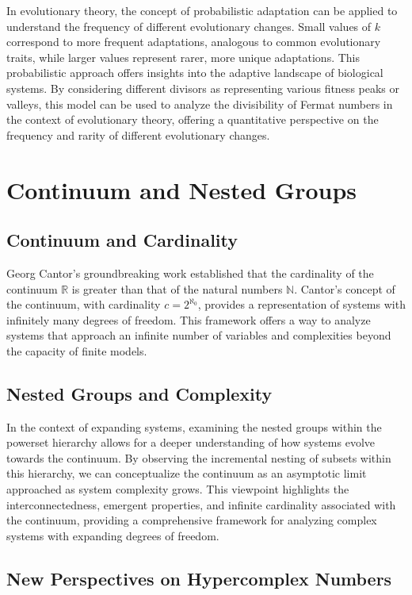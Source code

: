 \documentclass[12pt]{article}
\begin{document}
In evolutionary theory, the concept of probabilistic adaptation can be applied to understand the frequency of different evolutionary changes. Small values of \( k \) correspond to more frequent adaptations, analogous to common evolutionary traits, while larger values represent rarer, more unique adaptations. This probabilistic approach offers insights into the adaptive landscape of biological systems. By considering different divisors as representing various fitness peaks or valleys, this model can be used to analyze the divisibility of Fermat numbers in the context of evolutionary theory, offering a quantitative perspective on the frequency and rarity of different evolutionary changes.

\section{Continuum and Nested Groups}

\subsection{Continuum and Cardinality}

Georg Cantor’s groundbreaking work established that the cardinality of the continuum \( \mathbb{R} \) is greater than that of the natural numbers \( \mathbb{N} \). Cantor’s concept of the continuum, with cardinality \( c = 2^{\aleph_0} \), provides a representation of systems with infinitely many degrees of freedom. This framework offers a way to analyze systems that approach an infinite number of variables and complexities beyond the capacity of finite models.

\subsection{Nested Groups and Complexity}

In the context of expanding systems, examining the nested groups within the powerset hierarchy allows for a deeper understanding of how systems evolve towards the continuum. By observing the incremental nesting of subsets within this hierarchy, we can conceptualize the continuum as an asymptotic limit approached as system complexity grows. This viewpoint highlights the interconnectedness, emergent properties, and infinite cardinality associated with the continuum, providing a comprehensive framework for analyzing complex systems with expanding degrees of freedom.

\subsection{New Perspectives on Hypercomplex Numbers}
\end{document}
